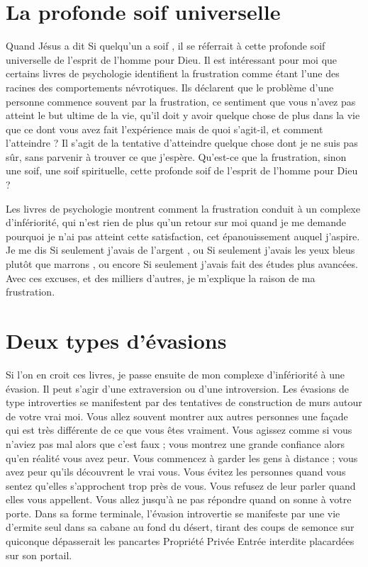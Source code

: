 \section{La profonde soif universelle}

Quand Jésus a dit\frcolon{} \Og Si quelqu'un a soif \Fg{}, il se réferrait
 à cette profonde soif universelle de l'esprit de l'homme pour Dieu.
 Il est intéressant pour moi que certains livres de psychologie
 identifient la frustration comme étant l'une des racines
 des comportements névrotiques. Ils déclarent que le problème
 d'une personne commence souvent par la frustration,
 ce sentiment que vous n'avez pas atteint le but ultime de la vie,
 qu'il doit y avoir quelque chose de plus dans la vie que ce dont
 vous avez fait l'expérience \ocadr mais de quoi s'agit-il, et comment
 l'atteindre ?
 Il s'agit de la tentative d'atteindre quelque chose dont je ne suis pas sûr,
 sans parvenir à trouver ce que j'espère. Qu'est-ce que la frustration,
 sinon une soif, une soif spirituelle, cette profonde soif de l'esprit
 de l'homme pour Dieu ?

Les livres de psychologie montrent comment la frustration con\-duit
 à un complexe d'infériorité, qui n'est rien de plus qu'un retour sur moi
 quand je me demande pourquoi je n'ai pas atteint cette satisfaction,
 cet épanouissement auquel j'aspire. Je me dis\frcolon{}
 \Og Si seulement j'avais de l'argent \Fg{}, ou\frcolon{}
 \Og Si seulement j'avais les yeux bleus plutôt que marrons \Fg{}, ou encore\frcolon{}
 \Og Si seulement j'avais fait des études plus avancées. \Fg{}
 Avec ces excuses, et des milliers d'autres, je m'explique la raison
 de ma frustration.


\section{Deux types d'\'evasions}

Si l'on en croit ces livres, je passe ensuite de mon complexe
 d'in\-fé\-rio\-ri\-té à une évasion.
 Il peut s'agir d'une extraversion ou d'une introversion.
 Les évasions de type introverties se manifestent par des tentatives
 de construction de murs autour de votre vrai moi.
 Vous allez souvent montrer aux autres personnes une façade qui est très
 différente de ce que vous êtes vraiment.
 Vous agissez comme si vous n'aviez pas mal alors que c'est faux ;
 vous montrez une grande confiance alors qu'en réalité vous avez peur.
 Vous commencez à garder les gens à distance ;
 vous avez peur qu'ils découvrent le vrai vous.
 Vous évitez les personnes quand vous sentez qu'elles s'approchent
 trop près de vous. Vous refusez de leur parler quand elles vous appellent.
 Vous allez jusqu'à ne pas répondre quand on sonne à votre porte.
 Dans sa forme terminale, l'évasion introvertie se manifeste par une vie
 d'ermite seul dans sa cabane au fond du désert, tirant des coups de semonce
 sur quiconque dépasserait les pancartes
 \Og Propriété Privée \ocadr Entrée interdite \Fg{} placardées sur son portail.

